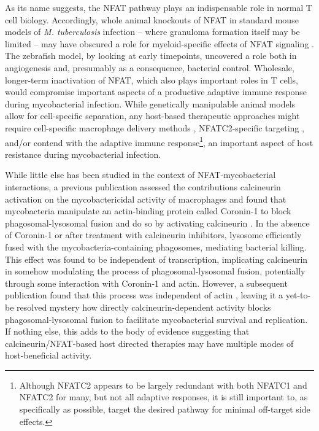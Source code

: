 As its name suggests, the NFAT pathway plays an indispensable role in normal T cell biology. Accordingly, whole animal knockouts of NFAT in standard mouse models of \textit{M. tuberculosis} infection -- where granuloma formation itself may be limited -- may have obscured a role for myeloid-specific effects of NFAT signaling \citep{Via2012}. The zebrafish model, by looking at early timepoints, uncovered a role both in angiogenesis and, presumably as a consequence, bacterial control. Wholesale, longer-term inactivation of NFAT, which also plays important roles in T cells, would compromise important aspects of a productive adaptive immune response during mycobacterial infection. While genetically manipulable animal models allow for cell-specific separation, any host-based therapeutic approaches might require cell-specific macrophage delivery methods \citep{Hu2019, Mukhtar2020, Colombo2022}, NFATC2-specific targeting \citep{Kitamura2021}, and/or contend with the adaptive immune response\footnote{Although NFATC2 appears to be largely redundant with both NFATC1 and NFATC2 for many, but not all adaptive responses, it is still important to, as specifically as possible, target the desired pathway for minimal off-target side effects.}, an important aspect of host resistance during mycobacterial infection.

While little else has been studied in the context of NFAT-mycobacterial interactions, a previous publication assessed the contributions calcineurin activation on the mycobactericidal activity of macrophages and found that mycobacteria manipulate an actin-binding protein called Coronin-1 to block phagosomal-lysosomal fusion and do so by activating calcineurin \citep{Jayachandran2007}. In the absence of Coronin-1 or after treatment with calcineurin inhibitors, lysosome efficiently fused with the mycobacteria-containing phagosomes, mediating bacterial killing. This effect was found to be independent of transcription, implicating calcineurin in somehow modulating the process of phagosomal-lysosomal fusion, potentially through some interaction with Coronin-1 and actin. However, a subsequent publication found that this process was independent of actin \citep{Jayachandran2008}, leaving it a yet-to-be resolved mystery how directly calcineurin-dependent activity blocks phagosomal-lysosomal fusion to facilitate mycobacterial survival and replication. If nothing else, this adds to the body of evidence suggesting that calcineurin/NFAT-based host directed therapies may have multiple modes of host-beneficial activity.

